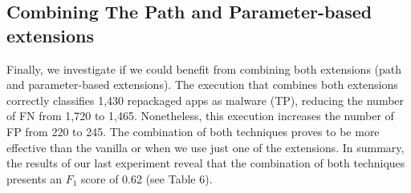 \begin{table}[ht]
  \caption{Accuracy of the \mas with aid of complementary techniques (3,211 app pairs).}
  \label{tab:accuracyParameter}
\end{table}

\subsection{Combining The Path and Parameter-based extensions} \label{sec:combination}

Finally, we investigate if we could benefit
from combining both extensions (path and parameter-based extensions).
The execution that combines both extensions correctly classifies 1,430 repackaged apps as malware (TP),
reducing the number of FN from 1,720 to 1,465. Nonetheless, this execution increases the number of FP from 220 to 245.
The combination of both techniques proves to be more effective than the vanilla \mas or when we use just one of the extensions.
In summary, the results of our last experiment reveal that the combination of both techniques presents an $F_1$ score of
0.62 (see Table 6).

